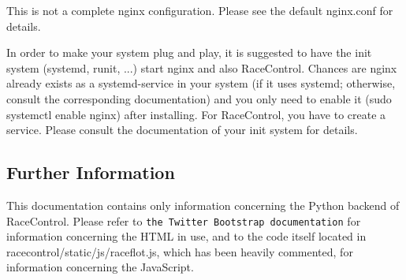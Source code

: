 This is not a complete {\ttfamily nginx} configuration. Please see the default nginx.\+conf for details.

In order to make your system plug and play, it is suggested to have the init system ({\ttfamily systemd}, {\ttfamily runit}, ...) start {\ttfamily nginx} and also {\ttfamily Race\+Control}. Chances are {\ttfamily nginx} already exists as a {\ttfamily systemd}-\/service in your system (if it uses {\ttfamily systemd}; otherwise, consult the corresponding documentation) and you only need to enable it ({\ttfamily sudo systemctl enable nginx}) after installing. For {\ttfamily Race\+Control}, you have to create a service. Please consult the documentation of your init system for details.

\subsection*{Further Information }

This documentation contains only information concerning the Python backend of Race\+Control. Please refer to {\tt the Twitter Bootstrap documentation} for information concerning the H\+T\+ML in use, and to the code itself located in {\ttfamily racecontrol/static/js/raceflot.\+js}, which has been heavily commented, for information concerning the Java\+Script. 